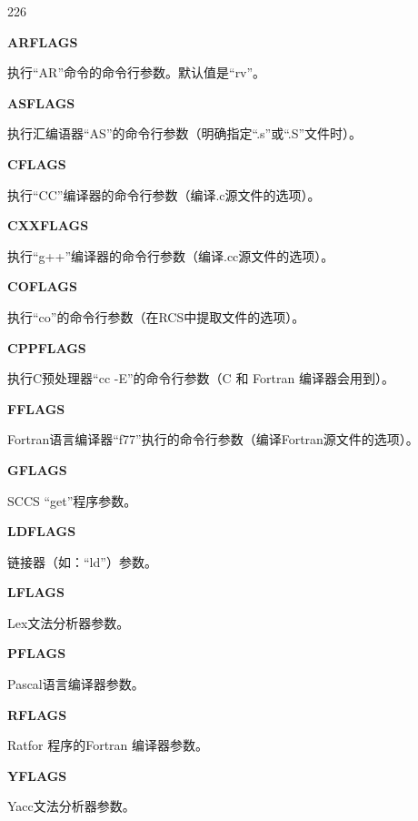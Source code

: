 \begin{dinglist}{226}
\itemsep=4pt

\item \textbf{ARFLAGS}

执行“AR”命令的命令行参数。默认值是“rv”。

\item \textbf{ASFLAGS}

执行汇编语器“AS”的命令行参数（明确指定“.s”或“.S”文件时）。

\item \textbf{CFLAGS}

执行“CC”编译器的命令行参数（编译.c源文件的选项）。

\item \textbf{CXXFLAGS}

执行“g++”编译器的命令行参数（编译.cc源文件的选项）。

\item \textbf{COFLAGS}

执行“co”的命令行参数（在RCS中提取文件的选项）。

\item \textbf{CPPFLAGS}

执行C预处理器“cc -E”的命令行参数（C 和 Fortran 编译器会用到）。

\item \textbf{FFLAGS}

Fortran语言编译器“f77”执行的命令行参数（编译Fortran源文件的选项）。

\item \textbf{GFLAGS}

SCCS “get”程序参数。

\item \textbf{LDFLAGS}

链接器（如：“ld”）参数。

\item \textbf{LFLAGS}

Lex文法分析器参数。

\item \textbf{PFLAGS}

Pascal语言编译器参数。

\item \textbf{RFLAGS}

Ratfor 程序的Fortran 编译器参数。

\item \textbf{YFLAGS}

Yacc文法分析器参数。

\end{dinglist}


